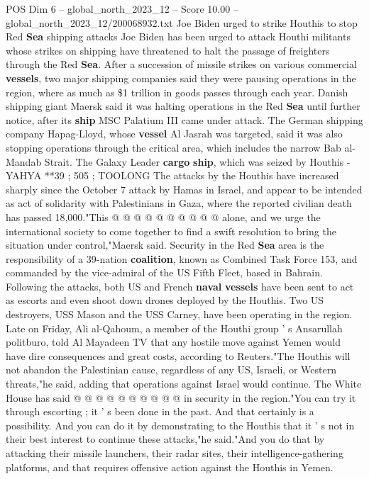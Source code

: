 \begin{textsample}{POS Dim 6 – global\_north\_2023\_12 – Score 10.00 – global\_north\_2023\_12/200068932.txt}  \label{ex:f6_pos_134}
Joe Biden urged to strike Houthis to stop Red \textbf{Sea} shipping attacks Joe Biden has been urged to attack Houthi militants whose strikes on shipping have threatened to halt the passage of freighters through the Red \textbf{Sea}.
After a succession of missile strikes on various commercial \textbf{vessels}, two major shipping companies said they were pausing operations in the region, where as much as \$1 trillion in goods passes through each year.
Danish shipping giant Maersk said it was halting operations in the Red \textbf{Sea} until further notice, after its \textbf{ship} MSC Palatium III came under attack.
The German shipping company Hapag-Lloyd, whose \textbf{vessel} Al Jasrah was targeted, said it was also stopping operations through the critical area, which includes the narrow Bab al-Mandab Strait.
The Galaxy Leader \textbf{cargo} \textbf{ship}, which was seized by Houthis - YAHYA **39 ; 505 ; TOOLONG The attacks by the Houthis have increased sharply since the October 7 attack by Hamas in Israel, and appear to be intended as act of solidarity with Palestinians in Gaza, where the reported civilian death has passed 18,000."This @ @ @ @ @ @ @ @ @ @ alone, and we urge the international society to come together to find a swift resolution to bring the situation under control,"Maersk said.
Security in the Red \textbf{Sea} area is the responsibility of a 39-nation \textbf{coalition}, known as Combined Task Force 153, and commanded by the vice-admiral of the US Fifth Fleet, based in Bahrain.
Following the attacks, both US and French \textbf{naval} \textbf{vessels} have been sent to act as escorts and even shoot down drones deployed by the Houthis.
Two US destroyers, USS Mason and the USS Carney, have been operating in the region.
Late on Friday, Ali al-Qahoum, a member of the Houthi group ' s Ansarullah politburo, told Al Mayadeen TV that any hostile move against Yemen would have dire consequences and great costs, according to Reuters."The Houthis will not abandon the Palestinian cause, regardless of any US, Israeli, or Western threats,"he said, adding that operations against Israel would continue.
The White House has said @ @ @ @ @ @ @ @ @ @ in security in the region."You can try it through escorting ; it ' s been done in the past.
And that certainly is a possibility.
And you can do it by demonstrating to the Houthis that it ' s not in their best interest to continue these attacks,"he said."And you do that by attacking their missile launchers, their radar sites, their intelligence-gathering platforms, and that requires offensive action against the Houthis in Yemen.

\end{textsample}
